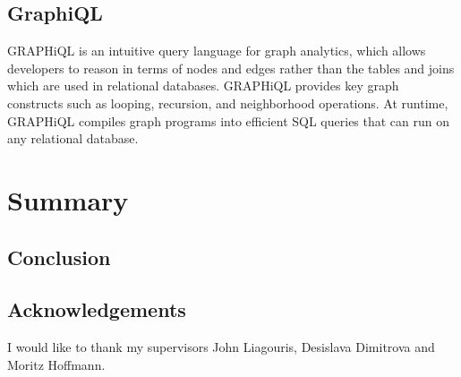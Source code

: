 \documentclass[11pt,singlecolumn]{scrartcl}
\begin{document}
\clearpage

\subsection{GraphiQL}
GRAPHiQL is an intuitive query language for graph analytics, which allows developers to reason in terms of nodes and edges rather than the tables and joins which are used in relational databases. GRAPHiQL provides key graph constructs such as looping, recursion, and neighborhood operations. At runtime, GRAPHiQL compiles graph programs into efficient SQL queries that can run on any relational database. \cite {Graphiql}

\clearpage

\section{Summary}

\subsection{Conclusion}

\subsection{Acknowledgements}
I would like to thank my supervisors John Liagouris, Desislava Dimitrova and Moritz Hoffmann.

\clearpage


{}

\end{document}
